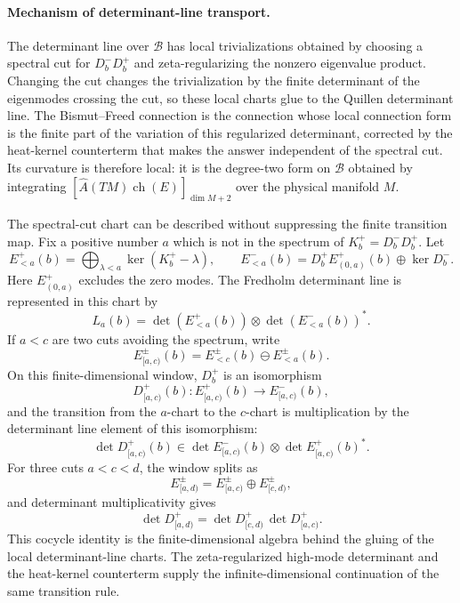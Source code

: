 \paragraph{Mechanism of determinant-line transport.}
The determinant line over \(\mathcal B\) has local trivializations obtained by
choosing a spectral cut for \(D_b^-D_b^+\) and zeta-regularizing the nonzero
eigenvalue product.  Changing the cut changes the trivialization by the finite
determinant of the eigenmodes crossing the cut, so these local charts glue to
the Quillen determinant line.  The Bismut--Freed connection is the connection
whose local connection form is the finite part of the variation of this
regularized determinant, corrected by the heat-kernel counterterm that makes
the answer independent of the spectral cut.  Its curvature is therefore local:
it is the degree-two form on \(\mathcal B\) obtained by integrating
\([\widehat A(TM)\operatorname{ch}(E)]_{\dim M+2}\) over the physical
manifold \(M\).

The spectral-cut chart can be described without suppressing the finite
transition map.  Fix a positive number \(a\) which is not in the spectrum of
\(K_b^+=D_b^-D_b^+\).  Let
\[
  E_{<a}^+(b)
  =
  \bigoplus_{\lambda<a}\ker(K_b^+-\lambda),
  \qquad
  E_{<a}^-(b)
  =
  D_b^+E_{(0,a)}^+(b)\oplus\ker D_b^- .
\]
Here \(E_{(0,a)}^+\) excludes the zero modes.  The Fredholm determinant line is
represented in this chart by
\[
  L_a(b)
  =
  \det(E_{<a}^+(b))\otimes \det(E_{<a}^-(b))^* .
\]
If \(a<c\) are two cuts avoiding the spectrum, write
\[
  E_{[a,c)}^\pm(b)
  =
  E_{<c}^\pm(b)\ominus E_{<a}^\pm(b).
\]
On this finite-dimensional window, \(D_b^+\) is an isomorphism
\[
  D_{[a,c)}^+(b):
  E_{[a,c)}^+(b)\longrightarrow E_{[a,c)}^-(b),
\]
and the transition from the \(a\)-chart to the \(c\)-chart is multiplication by
the determinant line element of this isomorphism:
\[
  \det D_{[a,c)}^+(b)
  \in
  \det E_{[a,c)}^-(b)\otimes \det E_{[a,c)}^+(b)^* .
\]
For three cuts \(a<c<d\), the window splits as
\[
  E_{[a,d)}^\pm
  =
  E_{[a,c)}^\pm\oplus E_{[c,d)}^\pm,
\]
and determinant multiplicativity gives
\[
  \det D_{[a,d)}^+
  =
  \det D_{[c,d)}^+\,
  \det D_{[a,c)}^+ .
\]
This cocycle identity is the finite-dimensional algebra behind the gluing of
the local determinant-line charts.  The zeta-regularized high-mode determinant
and the heat-kernel counterterm supply the infinite-dimensional continuation of
the same transition rule.

